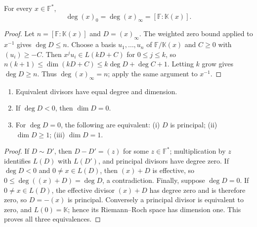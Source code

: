 \begin{theorem}
\label{par-thm-principal-degree-zero}
\uses{}
For every $x\in\mathbb F^*$,
\[
\deg(x)_0=\deg(x)_\infty=[\mathbb F:\mathbb K(x)].
\]
\end{theorem}
\begin{proof}
Let $n=[\mathbb F:\mathbb K(x)]$ and $D=(x)_\infty$. The weighted zero bound
applied to $x^{-1}$ gives $\deg D\leq n$. Choose a basis $u_1,\ldots,u_n$ of
$\mathbb F/\mathbb K(x)$ and $C\geq0$ with $(u_i)\geq-C$. Then
$x^ju_i\in L(kD+C)$ for $0\leq j\leq k$, so
$n(k+1)\leq\dim(kD+C)\leq k\deg D+\deg C+1$. Letting $k$ grow gives
$\deg D\geq n$. Thus $\deg(x)_\infty=n$; apply the same argument to $x^{-1}$.
\end{proof}

\begin{corollary}
\label{par-cor-equivalent-divisors}
\uses{}
\begin{enumerate}
\item Equivalent divisors have equal degree and dimension.
\item If $\deg D<0$, then $\dim D=0$.
\item For $\deg D=0$, the following are equivalent: (i) $D$ is principal;
(ii) $\dim D\geq1$; (iii) $\dim D=1$.
\end{enumerate}
\end{corollary}
\begin{proof}
If $D\sim D'$, then $D-D'=(z)$ for some $z\in\mathbb F^*$; multiplication by
$z$ identifies $L(D)$ with $L(D')$, and principal divisors have degree zero.
If $\deg D<0$ and $0\ne x\in L(D)$, then $(x)+D$ is effective, so
$0\leq\deg((x)+D)=\deg D$, a contradiction.  Finally, suppose $\deg D=0$.
If $0\ne x\in L(D)$, the effective divisor $(x)+D$ has degree zero and is
therefore zero, so $D=-(x)$ is principal.  Conversely a principal divisor is
equivalent to zero, and $L(0)=\mathbb K$; hence its Riemann--Roch space has
dimension one.  This proves all three equivalences.
\end{proof}

